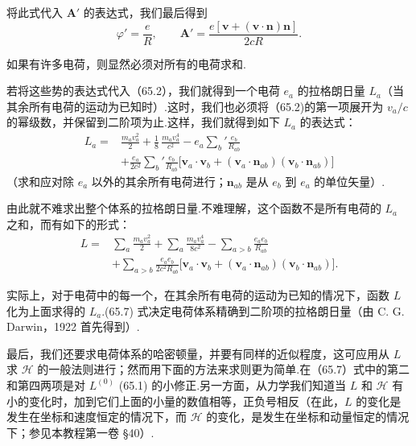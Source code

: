 将此式代入 $\boldsymbol{A}'$ 的表达式，我们最后得到
\begin{equation}
  \varphi'=\frac{e}{R},\qquad
  \boldsymbol{A}'=\frac{e[\boldsymbol{v}+(\boldsymbol{v}\cdot\boldsymbol{n})\boldsymbol{n}]}{2cR}.
\end{equation}

如果有许多电荷，则显然必须对所有的电荷求和.

若将这些势的表达式代入（65.2），我们就得到一个电荷 $e_a$ 的拉格朗日量 $L_a$（当其余所有电荷的运动为已知时）.这时，我们也必须将（65.2)的第一项展开为 $v_a/c$ 的幂级数，并保留到二阶项为止.这样，我们就得到如下 $L_a$ 的表达式：
\begin{equation*}
\begin{aligned}
  L_a={}&\frac{m_av_a^2}{2}+\frac{1}{8}\,\frac{m_av_a^4}{c^2}
  -e_a\sum_b'\frac{e_b}{R_{ab}}\\
  &+\frac{e_a}{2c^2}\sum_b'\frac{e_b}{R_{ab}}
  \bigl[\boldsymbol{v}_a\cdot\boldsymbol{v}_b
  +(\boldsymbol{v}_a\cdot\boldsymbol{n}_{ab})
  (\boldsymbol{v}_b\cdot\boldsymbol{n}_{ab})\bigr]
\end{aligned}
\end{equation*}
（求和应对除 $e_a$ 以外的其余所有电荷进行；$\boldsymbol{n}_{ab}$ 是从 $e_b$ 到 $e_a$ 的单位矢量）.

由此就不难求出整个体系的拉格朗日量.不难理解，这个函数不是所有电荷的 $L_a$ 之和，而有如下的形式：
\begin{equation}
\begin{aligned}
  L={}&\sum_a\frac{m_av_a^2}{2}+\sum_a\frac{m_av_a^4}{8c^2}
  -\sum_{a>b}\frac{e_ae_b}{R_{ab}}\\
  &+\sum_{a>b}\frac{e_ae_b}{2c^2R_{ab}}
  \bigl[\boldsymbol{v}_a\cdot\boldsymbol{v}_b
  +(\boldsymbol{v}_a\cdot\boldsymbol{n}_{ab})
  (\boldsymbol{v}_b\cdot\boldsymbol{n}_{ab})\bigr].
\end{aligned}
\end{equation}

实际上，对于电荷中的每一个，在其余所有电荷的运动为已知的情况下，函数 $L$ 化为上面求得的 $L_a$.(65.7) 式决定电荷体系精确到二阶项的拉格朗日量（由 C. G. Darwin，1922 首先得到）.

最后，我们还要求电荷体系的哈密顿量，并要有同样的近似程度，这可应用从 $L$ 求 $\mathcal{H}$ 的一般法则进行；然而用下面的方法来求则更为简单.在（65.7）式中的第二和第四两项是对 $L^{(0)}$ (65.1) 的小修正.另一方面，从力学我们知道当 $L$ 和 $\mathcal{H}$ 有小的变化时，加到它们上面的小量的数值相等，正负号相反（在此，$L$ 的变化是发生在坐标和速度恒定的情况下，而 $\mathcal{H}$ 的变化，是发生在坐标和动量恒定的情况下；参见本教程第一卷 §40）.

